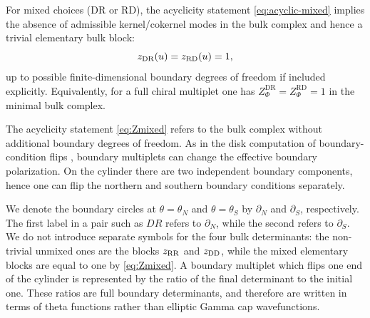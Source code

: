\documentclass[11pt,a4paper]{article}
\numberwithin{equation}{section}
\theoremstyle{plain}
\theoremstyle{definition}
\theoremstyle{remark}
\begin{document}
For mixed choices (DR or RD), the acyclicity statement \eqref{eq:acyclic-mixed} implies the absence of admissible kernel/cokernel modes in the bulk complex and hence a trivial elementary bulk block:
\begin{equation}
z_{\rm DR}(u)=z_{\rm RD}(u)=1,
\label{eq:Zmixed}
\end{equation}
up to possible finite-dimensional boundary degrees of freedom if included explicitly.  Equivalently, for a full chiral multiplet one has \(Z_{\Phi}^{\mathrm{DR}}=Z_{\Phi}^{\mathrm{RD}}=1\) in the minimal bulk complex.


The acyclicity statement \eqref{eq:Zmixed} refers to the bulk complex without additional boundary degrees of freedom.  As in the disk computation of boundary-condition flips \cite{Iannotti:2023jji,Dimofte:2017tpi,Longhi:2019hdh}, boundary multiplets can change the effective boundary polarization.  On the cylinder there are two independent boundary components, hence one can flip the northern and southern boundary conditions separately.

We denote the boundary circles at \(\theta=\theta_N\) and \(\theta=\theta_S\) by \(\partial_N\) and \(\partial_S\), respectively.  The first label in a pair such as \(DR\) refers to \(\partial_N\), while the second refers to \(\partial_S\).  We do not introduce separate symbols for the four bulk determinants: the non-trivial unmixed ones are the blocks \(z_{\rm RR}\) and \(z_{\rm DD}\), while the mixed elementary blocks are equal to one by \eqref{eq:Zmixed}.  A boundary multiplet which flips one end of the cylinder is represented by the ratio of the final determinant to the initial one.  These ratios are full boundary determinants, and therefore are written in terms of theta functions rather than elliptic Gamma cap wavefunctions.
\end{document}
